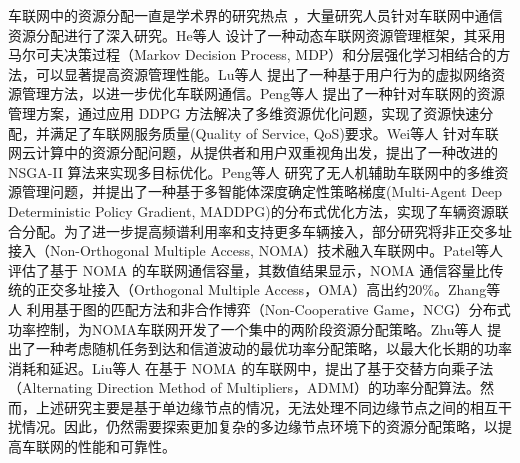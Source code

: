车联网中的资源分配一直是学术界的研究热点 \cite{noor-a-rahim2022a}，大量研究人员针对车联网中通信资源分配进行了深入研究。He等人 \cite{he2022meta} 设计了一种动态车联网资源管理框架，其采用马尔可夫决策过程（Markov Decision Process, MDP）和分层强化学习相结合的方法，可以显著提高资源管理性能。Lu等人 \cite{lu2021user} 提出了一种基于用户行为的虚拟网络资源管理方法，以进一步优化车联网通信。Peng等人 \cite{peng2020deep} 提出了一种针对车联网的资源管理方案，通过应用 DDPG 方法解决了多维资源优化问题，实现了资源快速分配，并满足了车联网服务质量(Quality of Service, QoS)要求。Wei等人 \cite{wei2022multi} 针对车联网云计算中的资源分配问题，从提供者和用户双重视角出发，提出了一种改进的 NSGA-II 算法来实现多目标优化。Peng等人 \cite{peng2021multi} 研究了无人机辅助车联网中的多维资源管理问题，并提出了一种基于多智能体深度确定性策略梯度(Multi-Agent Deep Deterministic Policy Gradient, MADDPG)的分布式优化方法，实现了车辆资源联合分配。为了进一步提高频谱利用率和支持更多车辆接入，部分研究将非正交多址接入（Non-Orthogonal Multiple Access, NOMA）技术融入车联网中。Patel等人 \cite{patel2021performance} 评估了基于 NOMA 的车联网通信容量，其数值结果显示，NOMA 通信容量比传统的正交多址接入（Orthogonal Multiple Access，OMA）高出约20\%。Zhang等人 \cite{zhang2021centralized} 利用基于图的匹配方法和非合作博弈（Non-Cooperative Game，NCG）分布式功率控制，为NOMA车联网开发了一个集中的两阶段资源分配策略。Zhu等人 \cite{zhu2021decentralized} 提出了一种考虑随机任务到达和信道波动的最优功率分配策略，以最大化长期的功率消耗和延迟。Liu等人 \cite{liu2019energy} 在基于 NOMA 的车联网中，提出了基于交替方向乘子法（Alternating Direction Method of Multipliers，ADMM）的功率分配算法。然而，上述研究主要是基于单边缘节点的情况，无法处理不同边缘节点之间的相互干扰情况。因此，仍然需要探索更加复杂的多边缘节点环境下的资源分配策略，以提高车联网的性能和可靠性。



